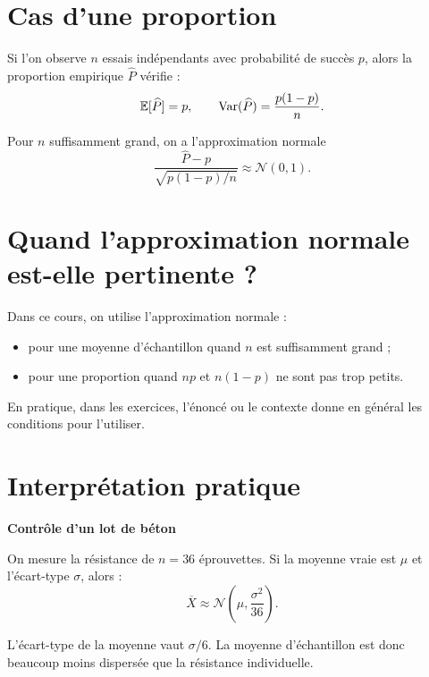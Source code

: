 \section{Cas d'une proportion}

\begin{Prop}
Si l'on observe $n$ essais indépendants avec probabilité de succès $p$, alors la proportion empirique $\widehat{P}$ vérifie :
$$
\mathbb{E}[\widehat{P}] = p,
\qquad
\operatorname{Var}(\widehat{P}) = \frac{p(1-p)}{n}.
$$
\end{Prop}

\begin{Prop}
Pour $n$ suffisamment grand, on a l'approximation normale
$$
\frac{\widehat{P}-p}{\sqrt{p(1-p)/n}} \approx \mathcal{N}(0,1).
$$
\end{Prop}

\section{Quand l'approximation normale est-elle pertinente ?}

\begin{Meth}
Dans ce cours, on utilise l'approximation normale :
\begin{itemize}
    \item pour une moyenne d'échantillon quand $n$ est suffisamment grand ;
    \item pour une proportion quand $np$ et $n(1-p)$ ne sont pas trop petits.
\end{itemize}

En pratique, dans les exercices, l'énoncé ou le contexte donne en général les conditions pour l'utiliser.
\end{Meth}

\section{Interprétation pratique}

\begin{Ex}
\textbf{Contrôle d'un lot de béton}

On mesure la résistance de $n=36$ éprouvettes. Si la moyenne vraie est $\mu$ et l'écart-type $\sigma$, alors :
$$
\overline{X} \approx \mathcal{N}\left(\mu,\frac{\sigma^2}{36}\right).
$$

L'écart-type de la moyenne vaut $\sigma/6$. La moyenne d'échantillon est donc beaucoup moins dispersée que la résistance individuelle.
\end{Ex}

